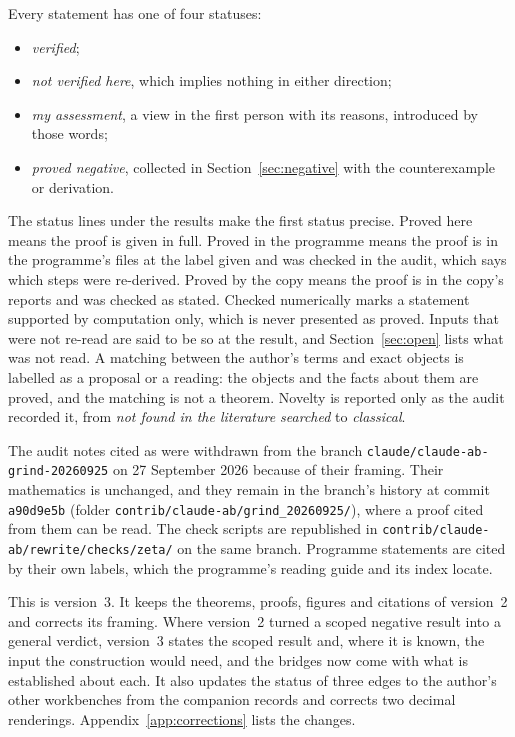 Every statement has one of four statuses:
\begin{itemize}
\item \emph{verified};
\item \emph{not verified here}, which implies nothing in either direction;
\item \emph{my assessment}, a view in the first person with its reasons, introduced by those words;
\item \emph{proved negative}, collected in Section~\ref{sec:negative} with the counterexample or derivation.
\end{itemize}
The status lines under the results make the first status precise. \textsf{Proved here} means the proof is given in full. \textsf{Proved in the programme} means the proof is in the programme's files at the label given and was checked in the audit, which says which steps were re-derived. \textsf{Proved by the copy} means the proof is in the copy's reports and was checked as stated. \textsf{Checked numerically} marks a statement supported by computation only, which is never presented as proved. Inputs that were not re-read are said to be so at the result, and Section~\ref{sec:open} lists what was not read. A matching between the author's terms and exact objects is labelled as a proposal or a reading: the objects and the facts about them are proved, and the matching is not a theorem. Novelty is reported only as the audit recorded it, from \emph{not found in the literature searched} to \emph{classical}.

The audit notes cited as  were withdrawn from the branch \texttt{claude/claude-ab-grind-20260925} on 27 September 2026 because of their framing. Their mathematics is unchanged, and they remain in the branch's history at commit \texttt{a90d9e5b} (folder \texttt{contrib/claude-ab/grind\_20260925/}), where a proof cited from them can be read. The check scripts are republished in \texttt{contrib/claude-ab/rewrite/checks/zeta/} on the same branch. Programme statements are cited by their own labels, which the programme's reading guide  and its index  locate.

This is version~3. It keeps the theorems, proofs, figures and citations of version~2 and corrects its framing. Where version~2 turned a scoped negative result into a general verdict, version~3 states the scoped result and, where it is known, the input the construction would need, and the bridges now come with what is established about each. It also updates the status of three edges to the author's other workbenches from the companion records and corrects two decimal renderings. Appendix~\ref{app:corrections} lists the changes.

